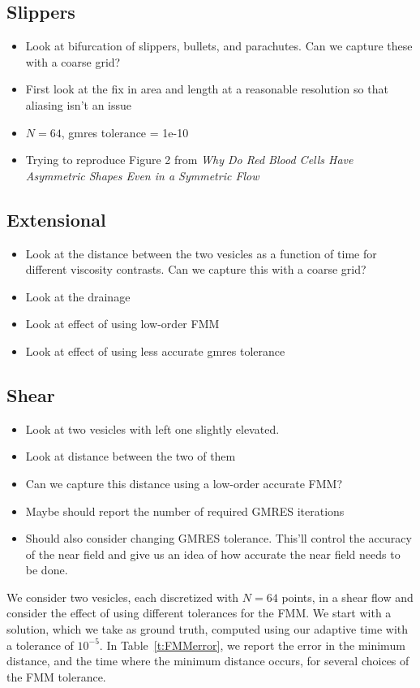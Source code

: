 \subsection{Slippers}
\begin{itemize}
  \item Look at bifurcation of slippers, bullets, and parachutes.  Can
  we capture these with a coarse grid?
  \item First look at the fix in area and length at a reasonable
  resolution so that aliasing isn't an issue
  \item $N=64$, gmres tolerance = 1e-10
  \item Trying to reproduce Figure 2 from {\em Why Do Red Blood Cells
  Have Asymmetric Shapes Even in a Symmetric Flow}
\end{itemize}





\subsection{Extensional}
\begin{itemize}
  \item Look at the distance between the two vesicles as a function of
  time for different viscosity contrasts.  Can we capture this with a
  coarse grid?
  \item Look at the drainage 
  \item Look at effect of using low-order FMM
  \item Look at effect of using less accurate gmres tolerance
\end{itemize}

\subsection{Shear}
\begin{itemize}
  \item Look at two vesicles with left one slightly elevated.  
  \item Look at distance between the two of them
  \item Can we capture this distance using a low-order accurate FMM?
  \item Maybe should report the number of required GMRES iterations
  \item Should also consider changing GMRES tolerance.  This'll control
  the accuracy of the near field and give us an idea of how accurate the
  near field needs to be done.
\end{itemize}
We consider two vesicles, each discretized with $N=64$ points, in a
shear flow and consider the effect of using different tolerances for
the FMM.  We start with a solution, which we take as ground truth,
computed using our adaptive time with a tolerance of $10^{-5}$.  In
Table~\ref{t:FMMerror}, we report the error in the minimum distance,
and the time where the minimum distance occurs, for several choices of
the FMM tolerance.


